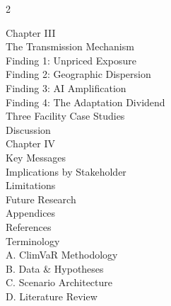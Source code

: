 \begin{multicols}{2}
{\columnbreak

{\fontsize{12}{15}\selectfont\displayfont\color{SEGreen}Chapter III}\\[3pt]
\noindent\hspace{5mm}The Transmission Mechanism \dotfill \pageref{toc:transmission}\\[1pt]
\noindent\hspace{5mm}Finding 1: Unpriced Exposure \dotfill \pageref{toc:f1}\\[1pt]
\noindent\hspace{5mm}Finding 2: Geographic Dispersion \dotfill \pageref{toc:f2}\\[1pt]
\noindent\hspace{5mm}Finding 3: AI Amplification \dotfill \pageref{toc:f3}\\[1pt]
\noindent\hspace{5mm}Finding 4: The Adaptation Dividend \dotfill \pageref{toc:f4}\\[1pt]
\noindent\hspace{5mm}Three Facility Case Studies \dotfill \pageref{toc:cases}\\[1pt]
\noindent\hspace{5mm}Discussion \dotfill \pageref{toc:discussion}\\[14pt]
%
{\fontsize{12}{15}\selectfont\displayfont\color{SEGreen}Chapter IV}\\[3pt]
\noindent\hspace{5mm}Key Messages \dotfill \pageref{toc:key}\\[1pt]
\noindent\hspace{5mm}Implications by Stakeholder \dotfill \pageref{toc:implications}\\[1pt]
\noindent\hspace{5mm}Limitations \dotfill \pageref{toc:limitations}\\[1pt]
\noindent\hspace{5mm}Future Research \dotfill \pageref{toc:future}\\[14pt]
%
{\fontsize{12}{15}\selectfont\displayfont\color{SEGreen}Appendices}\\[3pt]
\noindent\hspace{5mm}References \dotfill \pageref{toc:refs}\\[1pt]
\noindent\hspace{5mm}Terminology \dotfill \pageref{toc:terminology}\\[1pt]
\noindent\hspace{5mm}A. ClimVaR Methodology \dotfill \pageref{toc:appA}\\[1pt]
\noindent\hspace{5mm}B. Data \& Hypotheses \dotfill \pageref{toc:appB}\\[1pt]
\noindent\hspace{5mm}C. Scenario Architecture \dotfill \pageref{toc:appC}\\[1pt]
\noindent\hspace{5mm}D. Literature Review \dotfill \pageref{toc:appD}\\

}
\end{multicols}
